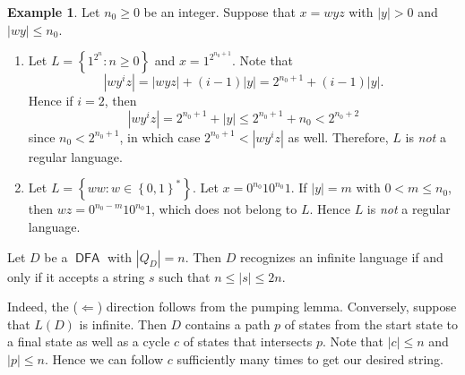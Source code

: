 \documentclass[10pt,letterpaper,cm]{nupset}
\theoremstyle{definition}
\newtheorem{exmp}[definition]{Example}
\theoremstyle{theorem}
\theoremstyle{remark}
\newcommand{\1}{\mathbf{1}}
\newcommand{\0}{\vec 0}
\DeclareMathOperator{\DFA}{\mathsf{DFA}}
\begin{document}
\begin{exmp} Let $n_0\geq 0$ be an integer. Suppose that $x=wyz$ with $\left\lvert{y}\right\rvert >0$ and $\left\lvert{wy}\right\rvert\leq n_0$.
\begin{enumerate}
\item Let $L=  \left\{ 1^{2^n} : n\geq 0\right\}$ and $x= 1^{2^{n_0+1}}$.  Note that $$\left\lvert{wy^iz}\right\rvert = \left\lvert{wyz}\right\rvert + (i-1)\left\lvert{y}\right\rvert = 2^{n_0+1} + (i-1)\left\lvert{y}\right\rvert.$$ Hence if $i=2$, then 
\[
\left\lvert{wy^i z}\right\rvert = 2^{n_0+1} +\left\lvert{y}\right\rvert \leq 2^{n_0+1} +n_0 < 2^{n_0+2}
\] since $n_0 < 2^{n_0+1}$, in which case $2^{n_0+1} < \left\lvert{wy^i z}\right\rvert$ as well. Therefore, $L$ is \emph{not} a regular language. 
\item Let $L = \left\{ ww : w \in \left\{0,1\right\}^{\ast}\right\}$. Let $x= 0^{n_0}10^{n_0}1$. If $\left\lvert{y}\right\rvert= m$ with $0<m\leq n_0$,  then $wz= 0^{n_0-m}10^{n_0}1$, which does not belong to $L$. Hence $L$ is \emph{not} a regular language. 
\end{enumerate}
\end{exmp}

\medskip

Let $D$ be a $\DFA$ with $\left\lvert{Q_D}\right\rvert =n$. Then $D$ recognizes an infinite language if and only if it accepts a string $s$ such that $n\leq \left\lvert{s}\right\rvert \leq 2n$.

Indeed, the ($\Longleftarrow$) direction follows from the pumping lemma. Conversely, suppose that $L(D)$ is infinite. Then $D$ contains a path $p$ of states from the start state to a final state as well as a cycle $c$ of states  that intersects $p$. Note that $\left\lvert{c}\right\rvert \leq n$ and $\left\lvert{p}\right\rvert \leq n$. Hence we can follow $c$ sufficiently many times to get our desired string.

\medskip
\end{document}
